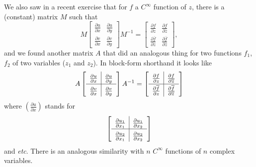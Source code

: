 \documentclass[12pt]{article}
\newcommand{\ita}[1]{\textit{#1}}
\newcommand\inv[1]{#1^{-1}}
\theoremstyle{definition}
\theoremstyle{remark}
\begin{document}
We also saw in a recent exercise that for $f$ a $C^{\infty}$ function of $z$, there is a (constant) matrix $M$ such that 
\begin{equation}
    M 
    \begin{bmatrix}
        \frac{\partial u}{\partial x} & \frac{\partial u}{\partial y} \\[0.5em]
        \frac{\partial v}{\partial x} & \frac{\partial v}{\partial y}
    \end{bmatrix}
    \inv{M} = 
    \begin{bmatrix}
        \frac{\partial f}{\partial z} & \frac{\partial f}{\partial \overline{z}} \\[0.5em]
        \frac{\partial \overline{f}}{\partial z} & \frac{\partial \overline{f}}{\partial \overline{z}}
    \end{bmatrix},
\end{equation}
and we found another matrix $A$ that did an analogous thing for two functions $f_1$, $f_2$ of two variables ($z_1$ and $z_2$). In block-form shorthand it looks like \begin{equation}
    A 
    \left[
        \def\arraystretch{1.5}
        \begin{array}{c | c}
            \frac{\partial u}{\partial x} & \frac{\partial u}{\partial y} \\
            \hline 
            \frac{\partial v}{\partial x} & \frac{\partial v}{\partial y}
        \end{array}
    \right]
    \inv{A} 
    = 
    \left[
        \def\arraystretch{1.5}
        \begin{array}{c | c}
            \frac{\partial f}{\partial z} & \frac{\partial f}{\partial \overline{z}} \\
            \hline 
            \frac{\partial \overline{f}}{\partial z} & \frac{\partial \overline{f}}{\partial \overline{z}}
        \end{array}
    \right]
\end{equation}
where $\left( \frac{\partial u}{\partial x} \right)$ stands for 
\begin{equation}
    \left[
        \def\arraystretch{1.5}
        \begin{array}{c | c}
            \frac{\partial u_1}{\partial x_1} & \frac{\partial u_1}{\partial x_2} \\
            \hline 
            \frac{\partial u_2}{\partial x_1} & \frac{\partial u_2}{\partial x_2}
        \end{array}
    \right]
\end{equation}
and \ita{etc}. There is an analogous similarity with $n$ $C^{\infty}$ functions of $n$ complex variables.
\end{document}
